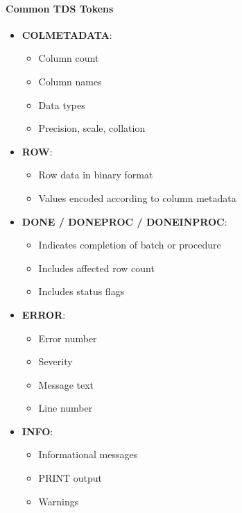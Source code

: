 \paragraph{Common TDS Tokens}

\begin{itemize}
    \item \textbf{COLMETADATA}:
    \begin{itemize}
        \item Column count
        \item Column names
        \item Data types
        \item Precision, scale, collation
    \end{itemize}
    
    \item \textbf{ROW}:
    \begin{itemize}
        \item Row data in binary format
        \item Values encoded according to column metadata
    \end{itemize}
    
    \item \textbf{DONE / DONEPROC / DONEINPROC}:
    \begin{itemize}
        \item Indicates completion of batch or procedure
        \item Includes affected row count
        \item Includes status flags
    \end{itemize}
    
    \item \textbf{ERROR}:
    \begin{itemize}
        \item Error number
        \item Severity
        \item Message text
        \item Line number
    \end{itemize}
    
    \item \textbf{INFO}:
    \begin{itemize}
        \item Informational messages
        \item PRINT output
        \item Warnings
    \end{itemize}
\end{itemize}

